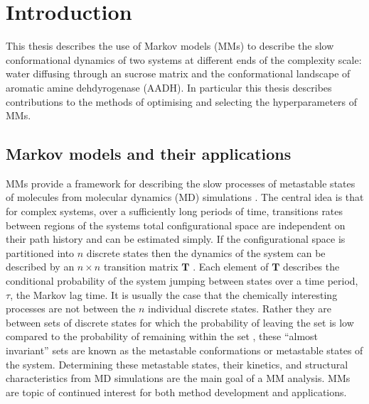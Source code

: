 %
%
\let\textcircled=\pgftextcircled
\chapter{Introduction}
\label{chap:intro}
This thesis describes the use of Markov models (MMs) to describe the slow conformational  dynamics of two systems at different ends of the complexity scale: water diffusing through an sucrose matrix and the conformational landscape of aromatic amine dehdyrogenase (AADH). In particular this thesis describes contributions to the methods of optimising and selecting the hyperparameters of MMs. 

\section{Markov models and their applications}
MMs provide a framework for describing the slow processes of metastable states of molecules from molecular dynamics (MD) simulations \cite{prinzMarkovModelsMolecular2011}. The central idea \cite{zwanzigClassicalDynamicsContinuous1983a} is that for complex systems, over a sufficiently long periods of time, transitions rates between regions of the systems total configurational space are independent on their path history and can be estimated simply. If the configurational space is partitioned into $n$ discrete states then the dynamics of the system can be described by an $n\times n$ transition matrix $\mathbf{T}$ \cite{prinzMarkovModelsMolecular2011}. Each element of $\mathbf{T}$ describes the conditional probability of the system jumping between states \cite{prinzMarkovModelsMolecular2011} over a time period, $\tau$, the Markov lag time. It is usually the case that the chemically interesting processes are not between the $n$ individual discrete states. Rather they are between sets of discrete states for which the probability of leaving the set is low compared to the probability of remaining within the set \cite{schutteDirectApproachConformational1999}, these ``almost invariant'' sets are known as the metastable conformations or metastable states of the system. Determining these metastable states, their kinetics, and structural characteristics from MD simulations are the main goal of a MM analysis. MMs are  topic of continued interest \cite{husicMarkovStateModels2018,noeMarkovModelsMolecular2019b, wangConstructingMarkovState2018c} for both method development and applications.  

